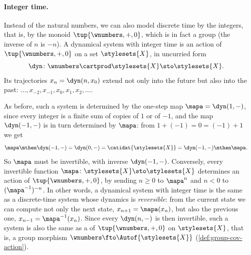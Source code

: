 \paragraph{Integer time.}
Instead of the natural numbers, we can also model discrete time by the integers, that is, by the monoid $\tup{\wnumbers, +, 0}$, which is in fact a group (the inverse of $n$ is $-n$).
A dynamical system with integer time is an action of $\tup{\wnumbers, +, 0}$ on a set $\stylesets{X}$, in uncurried form
\begin{equation}
    \label{eq:integer-time-dynamics}
    \dyn \colon \wnumbers \cartprod \stylesets{X} \sto \stylesets{X}.
\end{equation}
Its trajectories $x_n = \dyn(n, x_0)$ extend not only into the future but also into the past: $\dots, x_{-2}, x_{-1}, x_0, x_1, x_2, \dots$.

As before, such a system is determined by the one-step map $\mapa = \dyn(1, -)$, since every integer is a finite sum of copies of $1$ or of $-1$, and the map $\dyn(-1, -)$ is in turn determined by $\mapa$: from $1 + (-1) = 0 = (-1) + 1$ we get
\begin{equation}
    \mapa \mthen \dyn(-1, -) = \dyn(0, -) = \catidat{\stylesets{X}} = \dyn(-1, -) \mthen \mapa.
\end{equation}
So $\mapa$ must be invertible, with inverse $\dyn(-1, -)$.
Conversely, every invertible function $\mapa \colon \stylesets{X} \sto \stylesets{X}$ determines an action of $\tup{\wnumbers, +, 0}$, by sending $n \geq 0$ to $\mapa^n$ and $n < 0$ to $(\mapa^{-1})^{-n}$.
In other words, a dynamical system with integer time is the same as a discrete-time system whose dynamics is \emph{reversible}: from the current state we can compute not only the next state, $x_{n+1} = \mapa(x_n)$, but also the previous one, $x_{n-1} = \mapa^{-1}(x_n)$.
Since every $\dyn(n, -)$ is then invertible, such a system is also the same as a  of $\tup{\wnumbers, +, 0}$ on $\stylesets{X}$, that is, a group morphism $\wnumbers \fto \Autof{\stylesets{X}}$ (\cref{def:group-cov-action}).

